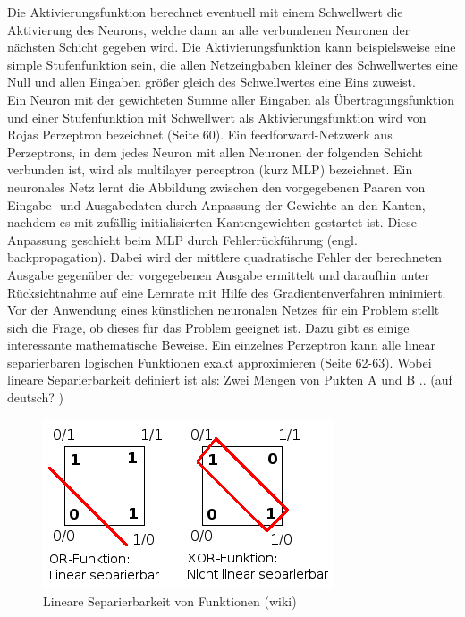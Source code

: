 \documentclass[
	12pt,
	a4paper,
	BCOR10mm,
	DIV14,
	listof=totoc,
	bibliography=totoc,
	headsepline
]{scrreprt}
\begin{document}
Die Aktivierungsfunktion berechnet eventuell mit einem Schwellwert die Aktivierung des Neurons, welche dann an alle verbundenen Neuronen der nächsten Schicht gegeben wird. Die Aktivierungsfunktion kann beispielsweise eine simple Stufenfunktion sein, die allen Netzeingbaben kleiner des Schwellwertes eine Null und allen Eingaben größer gleich des Schwellwertes eine Eins zuweist.\\
Ein Neuron mit der gewichteten Summe aller Eingaben als Übertragungsfunktion und einer Stufenfunktion mit Schwellwert als Aktivierungsfunktion wird von Rojas Perzeptron bezeichnet \cite{Rojas:1996:NNS:235222} (Seite 60).
Ein feedforward-Netzwerk aus Perzeptrons, in dem jedes Neuron mit allen Neuronen der folgenden Schicht verbunden ist, wird als multilayer perceptron (kurz MLP) bezeichnet.
Ein neuronales Netz lernt die Abbildung zwischen den vorgegebenen Paaren von Eingabe- und Ausgabedaten durch Anpassung der Gewichte an den Kanten, nachdem es mit zufällig initialisierten Kantengewichten gestartet ist. Diese Anpassung geschieht beim MLP durch Fehlerrückführung (engl. backpropagation). Dabei wird der mittlere quadratische Fehler der berechneten Ausgabe gegenüber der vorgegebenen Ausgabe ermittelt und daraufhin unter Rücksichtnahme auf eine Lernrate mit Hilfe des Gradientenverfahren minimiert.
Vor der Anwendung eines künstlichen neuronalen Netzes für ein Problem stellt sich die Frage, ob dieses für das Problem geeignet ist. Dazu gibt es einige interessante mathematische Beweise.
Ein einzelnes Perzeptron kann alle linear separierbaren logischen Funktionen exakt approximieren \cite{Rojas:1996:NNS:235222} (Seite 62-63). 
Wobei lineare Separierbarkeit definiert ist als: Zwei Mengen von Pukten A und B .. (auf deutsch? ) \\

\begin{figure}[h]
	\begin{center}
		\includegraphics[totalheight=0.2\textheight]{Bilder/Lineare_Separierbarkeit.png}
	\end{center}
	\caption{Lineare Separierbarkeit von Funktionen (wiki)}
	\label{fig:Neuron}
\end{figure} 
\end{document}
